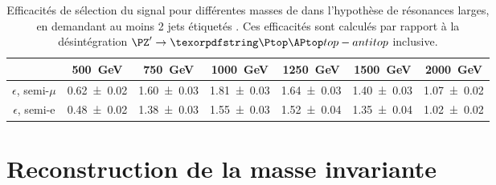 \begin{table}[p] \centering
  \begin{tabular}{ccccccc} \toprule
    & \SI{500}{\GeV} & \SI{750}{\GeV} & \SI{1000}{\GeV} & \SI{1250}{\GeV} & \SI{1500}{\GeV} & \SI{2000}{\GeV} \\ \midrule
    $\epsilon$, semi-$\mu$ & \num{0.62 \pm 0.02} & \num{1.60 \pm 0.03} & \num{1.81 \pm 0.03} & \num{1.64 \pm 0.03} & \num{1.40 \pm 0.03} & \num{1.07 \pm 0.02} \\
    $\epsilon$, semi-e & \num{0.48 \pm 0.02} & \num{1.38 \pm 0.03} & \num{1.55 \pm 0.03} & \num{1.52 \pm 0.04} & \num{1.35 \pm 0.04} & \num{1.02 \pm 0.02} \\ \bottomrule
  \end{tabular}
  \caption{Efficacités de sélection du signal pour différentes masses de \zprime dans l'hypothèse de résonances larges, en demandant au moins 2 jets étiquetés \Pbottom. Ces efficacités sont calculés par rapport à la désintégration $\zprime \rightarrow \ttbar$ inclusive.}
  \label{tab:eff_large_2b}
\end{table}

\section{Reconstruction de la masse invariante}